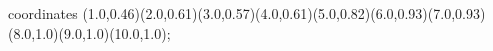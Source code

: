 					coordinates { (1.0,0.46)(2.0,0.61)(3.0,0.57)(4.0,0.61)(5.0,0.82)(6.0,0.93)(7.0,0.93)(8.0,1.0)(9.0,1.0)(10.0,1.0)};